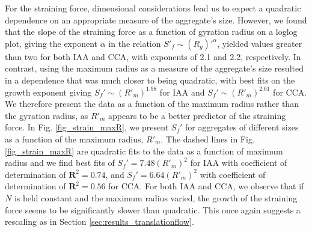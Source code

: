 For the straining force, dimensional considerations lead us to expect a quadratic dependence on an appropriate measure of the aggregate's size. However, we found  that the slope of the straining force as a function of gyration radius on a loglog plot, giving the exponent $\alpha$ in the relation $S'_f \sim (R_g)'^{\alpha}$, yielded values greater than two for both IAA and CCA, with exponents of 2.1 and 2.2, respectively. In contrast, using the maximum radius as a measure of the aggregate's size resulted in a dependence that was much closer to being quadratic, with best fits on the growth exponent giving $S_f' \sim (R'_m)^{1.98}$ for IAA and $S_f' \sim (R'_m)^{2.01}$ for CCA. 
We therefore present the data as a function of the maximum radius rather than the gyration radius, as $R'_m$ appears to be a better predictor of the straining force.
In Fig. \ref{fig_strain_maxR}, we present $S_f'$ for aggregates 
of different sizes as a function of the maximum 
radius, $R'_m$. 
The dashed lines in  Fig. \ref{fig_strain_maxR}  are quadratic fits to the data as a function of maximum radius and we find best fits of $S_f' = 7.48 (R'_m)^2$ for IAA with coefficient of determination of $\mathbf{R}^2=0.74$, and $S_f' = 6.64 (R'_m)^2$ with coefficient of determination of $\mathbf{R}^2=0.56$ for CCA. For both IAA and CCA, we observe that if $N$ is held constant and the maximum radius varied, the growth of the straining force seems to be significantly slower than quadratic. This once again suggests a rescaling as in Section \ref{sec:results_translationflow}. 


